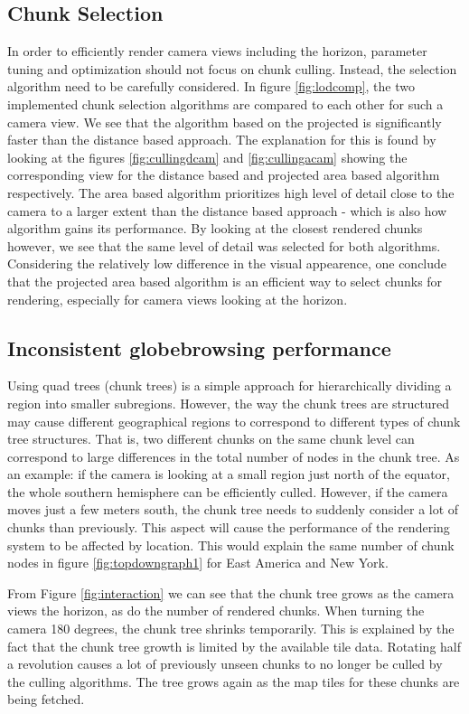 \subsection{Chunk Selection}
In order to efficiently render camera views including the horizon, parameter tuning and optimization should not focus on chunk culling. Instead, the selection algorithm need to be carefully considered. In figure \ref{fig:lodcomp}, the two implemented chunk selection algorithms are compared to each other for such a camera view. We see that the algorithm based on the projected is significantly faster than the distance based approach. The explanation for this is found by looking at the figures \ref{fig:cullingdcam} and \ref{fig:cullingacam} showing the corresponding view for the distance based and projected area based algorithm respectively. The area based algorithm prioritizes high level of detail close to the camera to a larger extent than the distance based approach - which is also how algorithm gains its performance. By looking at the closest rendered chunks however, we see that the same level of detail was selected for both algorithms. Considering the relatively low difference in the visual appearence, one conclude that the projected area based algorithm is an efficient way to select chunks for rendering, especially for camera views looking at the horizon.

\subsection{Inconsistent globebrowsing performance}
Using quad trees (chunk trees) is a simple approach for hierarchically dividing a region into smaller subregions. However, the way the chunk trees are structured may cause different geographical regions to correspond to different types of chunk tree structures. That is, two different chunks on the same chunk level can correspond to large differences in the total number of nodes in the chunk tree. As an example: if the camera is looking at a small region just north of the equator, the whole southern hemisphere can be efficiently culled. However, if the camera moves just a few meters south, the chunk tree needs to suddenly consider a lot of chunks than previously. This aspect will cause the performance of the rendering system to be affected by location. This would explain the same number of chunk nodes in figure \ref{fig:topdowngraph1} for East America and New York. 

From Figure \ref{fig:interaction} we can see that the chunk tree grows as the camera views the horizon, as do the number of rendered chunks. When turning the camera 180 degrees, the chunk tree shrinks temporarily. This is explained by the fact that the chunk tree growth is limited by the available tile data. Rotating half a revolution causes a lot of previously unseen chunks to no longer be culled by the culling algorithms. The tree grows again as the map tiles for these chunks are being fetched. 



